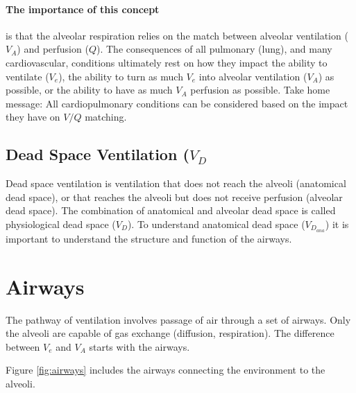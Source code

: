 \paragraph{The importance of this concept} is that the alveolar respiration relies on the match between alveolar ventilation ($V_A$) and perfusion ($Q$). The consequences of all pulmonary (lung), and many cardiovascular, conditions ultimately rest on how they impact the ability to ventilate ($V_e$), the ability to turn as much $V_e$ into alveolar ventilation ($V_A$) as possible, or the ability to have as much $V_A$ perfusion as possible. Take home message: All cardiopulmonary conditions can be considered based on the impact they have on $V/Q$ matching.

\subsection{Dead Space Ventilation ($V_D$}
Dead space ventilation is ventilation that does not reach the alveoli (anatomical dead space), or that reaches the alveoli but does not receive perfusion (alveolar dead space). The combination of anatomical and alveolar dead space is called physiological dead space ($V_D$). To understand anatomical dead space ($V_D_{ana}$) it is important to understand the structure and function of the airways.

\section{Airways}

The pathway of ventilation involves passage of air through a set of airways. Only the alveoli are capable of gas exchange (diffusion, respiration). The difference between $V_e$ and $V_A$ starts with the airways.  

Figure \ref{fig:airways} includes the airways connecting the environment to the alveoli.

